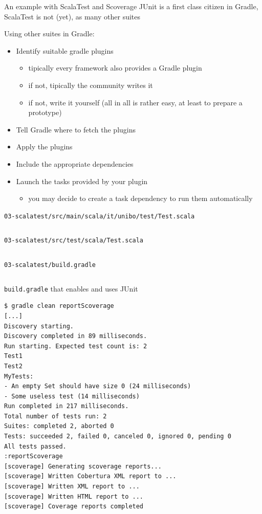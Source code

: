 \documentclass[presentation]{beamer}
\newcommand{\codefile}[3]{
	\begin{block}{\texttt{#1}}
		\inputminted[fontsize=#2,linenos=true,breaklines=true]{#3}{workspace/#1}
	\end{block}
}
\newcommand{\groovy}[2]{\codefile{#1}{#2}{groovy}}
\newcommand{\scala}[2]{\codefile{#1}{#2}{scala}}
\begin{document}
\begin{frame}{An example with ScalaTest and Scoverage}
	JUnit is a first class citizen in Gradle, ScalaTest is not (yet), as many other suites
	\begin{block}{Using other suites in Gradle:}
		\begin{itemize}
			\item Identify suitable gradle plugins
			\begin{itemize}
				\item tipically every framework also provides a Gradle plugin
				\item if not, tipically the community writes it
				\item if not, write it yourself (all in all is rather easy, at least to prepare a prototype)
			\end{itemize}
			\item Tell Gradle where to fetch the plugins
			\item Apply the plugins
			\item Include the appropriate dependencies
			\item Launch the tasks provided by your plugin
			\begin{itemize}
				\item you may decide to create a task dependency to run them automatically
			\end{itemize}
		\end{itemize}
	\end{block}
	\scala{03-scalatest/src/main/scala/it/unibo/test/Test.scala}{\normalsize}
	\scala{03-scalatest/src/test/scala/Test.scala}{\scriptsize}
	\groovy{03-scalatest/build.gradle}{\tiny}
		\begin{block}{\texttt{build.gradle} that enables and uses JUnit}
		\begin{verbatim}
$ gradle clean reportScoverage
[...]
Discovery starting.
Discovery completed in 89 milliseconds.
Run starting. Expected test count is: 2
Test1
Test2
MyTests:
- An empty Set should have size 0 (24 milliseconds)
- Some useless test (14 milliseconds)
Run completed in 217 milliseconds.
Total number of tests run: 2
Suites: completed 2, aborted 0
Tests: succeeded 2, failed 0, canceled 0, ignored 0, pending 0
All tests passed.
:reportScoverage
[scoverage] Generating scoverage reports...
[scoverage] Written Cobertura XML report to ...
[scoverage] Written XML report to ...
[scoverage] Written HTML report to ...
[scoverage] Coverage reports completed


\end{verbatim}
\end{block}
\end{frame}
\end{document}
